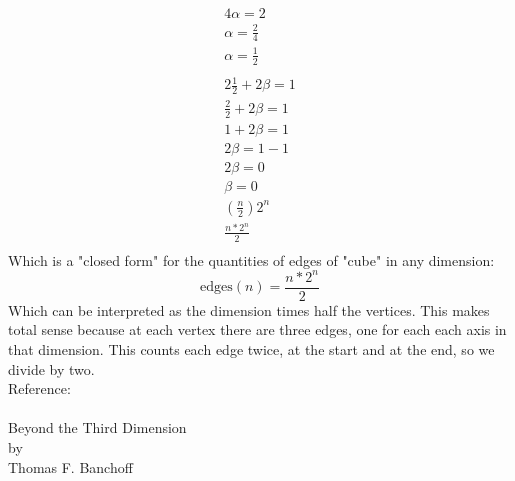 \documentclass[12pt]{article}
\begin{document}
	\begin{align*}
		4\alpha = 2\\		
		\alpha = \frac{2}{4}\\
		\alpha = \frac{1}{2}\\
		\\
		2\frac{1}{2} + 2\beta = 1\\
		\frac{2}{2} + 2\beta = 1\\		
		1 + 2\beta = 1\\
		2\beta = 1 - 1\\
		2\beta = 0\\		
		\beta = 0
		\\
		(\frac{n}{2})2^n\\		
		\frac{n*2^n}{2}\\
	\end{align*}
	Which is a "closed form" for the quantities of edges of "cube" in any dimension:
	$$ \text{edges}(n) = \frac{n*2^n}{2}$$	
	Which can be interpreted as the dimension times half the vertices. This makes total sense because at each vertex there are three edges, one for each each axis in that dimension. This counts each edge twice, at the start and at the end, so we divide by two.
	\newpage
	\\
	Reference:\\
	\\
	Beyond the Third Dimension\\	
	by \\
	Thomas F. Banchoff \\
\end{document}

